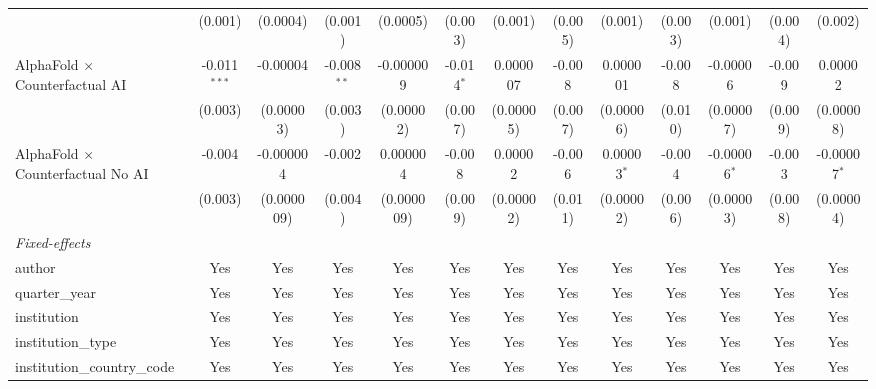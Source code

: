 \begin{tabular}{lcccccccccccc}
                                            & (0.001)        & (0.0004)     & (0.001)       & (0.0005)   & (0.003)      & (0.001)   & (0.005) & (0.001)       & (0.003)     & (0.001)        & (0.004) & (0.002)\\   
   AlphaFold $\times$ Counterfactual AI     & -0.011$^{***}$ & -0.00004     & -0.008$^{**}$ & -0.000009  & -0.014$^{*}$ & 0.000007  & -0.008  & 0.000001      & -0.008      & -0.00006       & -0.009  & 0.00002\\   
                                            & (0.003)        & (0.00003)    & (0.003)       & (0.00002)  & (0.007)      & (0.00005) & (0.007) & (0.00006)     & (0.010)     & (0.00007)      & (0.009) & (0.00008)\\   
   AlphaFold $\times$ Counterfactual No AI  & -0.004         & -0.000004    & -0.002        & 0.000004   & -0.008       & 0.00002   & -0.006  & 0.00003$^{*}$ & -0.004      & -0.00006$^{*}$ & -0.003  & -0.00007$^{*}$\\   
                                            & (0.003)        & (0.000009)   & (0.004)       & (0.000009) & (0.009)      & (0.00002) & (0.011) & (0.00002)     & (0.006)     & (0.00003)      & (0.008) & (0.00004)\\   
   \midrule
   \emph{Fixed-effects}\\
   author                                   & Yes            & Yes          & Yes           & Yes        & Yes          & Yes       & Yes     & Yes           & Yes         & Yes            & Yes     & Yes\\  
   quarter\_year                            & Yes            & Yes          & Yes           & Yes        & Yes          & Yes       & Yes     & Yes           & Yes         & Yes            & Yes     & Yes\\  
   institution                              & Yes            & Yes          & Yes           & Yes        & Yes          & Yes       & Yes     & Yes           & Yes         & Yes            & Yes     & Yes\\  
   institution\_type                        & Yes            & Yes          & Yes           & Yes        & Yes          & Yes       & Yes     & Yes           & Yes         & Yes            & Yes     & Yes\\  
   institution\_country\_code               & Yes            & Yes          & Yes           & Yes        & Yes          & Yes       & Yes     & Yes           & Yes         & Yes            & Yes     & Yes\\  

\end{tabular}
